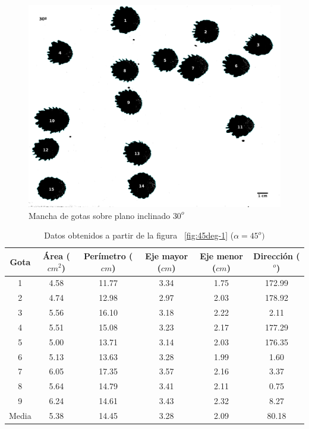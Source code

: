 \begin{figure}[H] \centering
\includegraphics[width=0.66\linewidth]{src/30_deg-1.png} \caption{Mancha de
gotas sobre plano inclinado $30^o$} \label{fig:30deg-1} \end{figure}

\begin{table}[H] \centering \caption{Datos obtenidos a partir de la figura
    ~\ref{fig:45deg-1} ($\alpha=45^o)$} \label{tab:45deg}
    \begin{tabular}{cccccc} \toprule Gota & Área ($cm^2$) & Perímetro ($cm$) &
        Eje mayor ($cm$) & Eje menor ($cm$) & Dirección ($^o$) \\ \midrule 1
                         & 4.58 & 11.77 & 3.34 & 1.75 & 172.99 \\ 2     & 4.74
                         & 12.98 & 2.97 & 2.03 & 178.92 \\ 3     & 5.56 & 16.10
                         & 3.18 & 2.22 & 2.11   \\ 4     & 5.51 & 15.08 & 3.23
                         & 2.17 & 177.29 \\ 5     & 5.00 & 13.71 & 3.14 & 2.03
                         & 176.35 \\ 6     & 5.13 & 13.63 & 3.28 & 1.99 & 1.60
        \\ 7     & 6.05 & 17.35 & 3.57 & 2.16 & 3.37   \\ 8     & 5.64 & 14.79
                 & 3.41 & 2.11 & 0.75   \\ 9     & 6.24 & 14.61 & 3.43 & 2.32 &
        8.27   \\ \midrule Media & 5.38 & 14.45 & 3.28 & 2.09 & 80.18 \\
    \bottomrule \end{tabular} \end{table}

